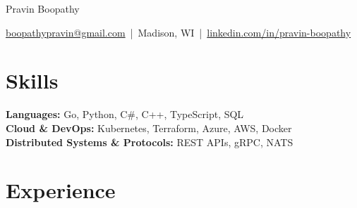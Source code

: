 \documentclass[11pt]{article}
\begin{document}
\centerline{\Huge Pravin Boopathy}

\vspace{5pt}

\centerline{\href{mailto:boopathypravin@gmail.com}{boopathypravin@gmail.com} \,|\, Madison, WI \,|\, \href{https://linkedin.com/in/pravin-boopathy}{linkedin.com/in/pravin-boopathy}}

\vspace{-10pt}

\section*{Skills}
\textbf{Languages:} Go, Python, C\#, C++, TypeScript, SQL \\
\textbf{Cloud \& DevOps:} Kubernetes, Terraform, Azure, AWS, Docker \\
\textbf{Distributed Systems \& Protocols:} REST APIs, gRPC, NATS 

\vspace{-6.5pt}

\section*{Experience}
\end{document}
